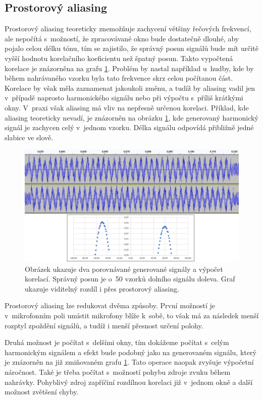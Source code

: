 \subsection{Prostorový aliasing}
\label{aliasing}

Prostorový aliasing teoreticky znemožňuje zachycení většiny řečových frekvencí, ale nepočítá s~možností, že zpracovávané okno bude dostatečně dlouhé, aby pojalo celou délku tónu, tím se zajistilo, že správný posun signálů bude mít určitě vyšší hodnotu korelačního koeficientu než špatný posun. Takto vypočtená korelace je znázorněna na grafu \ref{pic:graf:alias}. Problém by nastal například u~hudby, kde by během nahrávaného vzorku byla tato frekvence skrz celou počítanou část. Korelace by však měla zaznamenat jakoukoli změnu, a tudíž by aliasing vadil jen v~případě naprosto harmonického signálu nebo při výpočtu s~příliš krátkými okny. V~praxi však aliasing má vliv na nepřesně určenou korelaci. Příklad, kde aliasing teoreticky nevadí, je znázorněn na obrázku \ref{pic:graf:alias}, kde generovaný harmonický signál je zachycen celý v~jednom vzorku. Délka signálu odpovídá přibližně jedné slabice ve slově.

\begin{figure}[!ht]
	\centering
	\includegraphics[width=1\textwidth]{obrazky-figures/korelAliasing.png}
	\caption{Obrázek ukazuje dva porovnávané generované signály a výpočet korelací. Správný posun je o~50 vzorků dolního signálu doleva. Graf ukazuje viditelný rozdíl i přes prostorový aliasing.}
	\label{pic:graf:alias}
\end{figure}

Prostorový aliasing lze redukovat dvěma způsoby. První možností je v~mikrofonním poli umístit mikrofony blíže k~sobě, to však má za následek menší rozptyl zpoždění signálů, a tudíž i menší přesnost určení polohy. 

Druhá možnost je počítat s~delšími okny, tím dokážeme počítat s~celým harmonickým signálem a efekt bude podobný jako na generovaném signálu, který je znázorněn na již zmiňovaném grafu \ref{pic:graf:alias}. Tato operace naopak zvyšuje výpočetní náročnost. Také je třeba počítat s~možností pohybu zdroje zvuku během nahrávky. Pohyblivý zdroj zapříčiní rozdílnou korelaci již v~jednom okně a další možnost zvětšení chyby.

